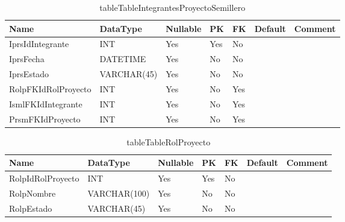 \begin{table}
	\caption{tableTableIntegrantesProyectoSemillero}
	\label{labelTableIntegrantesProyectoSemillero}
	\begin{tabular}{ |l|l|l|l|l|l|l| }
		\hline
		Name & DataType & Nullable & PK & FK & Default & Comment \\ \hline
		IprsIdIntegrante & INT & Yes & Yes & No &  & \\ \hline 
		IprsFecha & DATETIME & Yes & No & No &  & \\ \hline 
		IprsEstado & VARCHAR(45) & Yes & No & No &  & \\ \hline 
		RolpFKIdRolProyecto & INT & Yes & No & Yes &  & \\ \hline 
		IsmlFKIdIntegrante & INT & Yes & No & Yes &  & \\ \hline 
		PrsmFKIdProyecto & INT & Yes & No & Yes &  & \\ \hline 
		
	\end{tabular}
\end{table}


\begin{table}
	\caption{tableTableRolProyecto}
	\label{labelTableRolProyecto}
	\begin{tabular}{ |l|l|l|l|l|l|l| }
		\hline
		Name & DataType & Nullable & PK & FK & Default & Comment \\ \hline
		RolpIdRolProyecto & INT & Yes & Yes & No &  & \\ \hline 
		RolpNombre & VARCHAR(100) & Yes & No & No &  & \\ \hline 
		RolpEstado & VARCHAR(45) & Yes & No & No &  & \\ \hline 
		
	\end{tabular}
\end{table}


